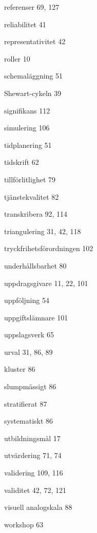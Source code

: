 referenser 69, 127

reliabilitet 41

representativitet 42

roller 10

schemaläggning 51

Shewart-cykeln 39

signifikans 112

simulering 106

tidplanering 51

tidskrift 62

tillförlitlighet 79

tjänstekvalitet 82

transkribera 92, 114

triangulering 31, 42, 118

tryckfrihetsförordningen 102

underhållsbarhet 80

uppdragsgivare 11, 22, 101

uppföljning 54

uppgiftslämnare 101

uppslagsverk 65

urval 31, 86, 89

kluster 86

slumpmässigt 86

stratifierat 87

systematiskt 86

utbildningsmål 17

utvärdering 71, 74

validering 109, 116

validitet 42, 72, 121

visuell analogskala 88

workshop 63
